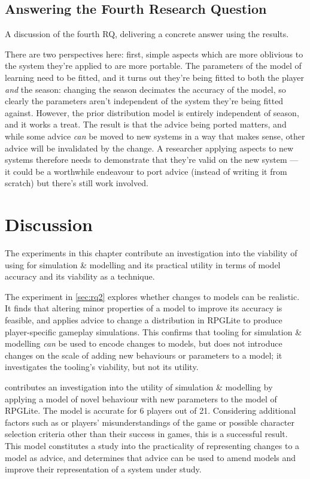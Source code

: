 \subsection{Answering the Fourth Research Question}

A discussion of the fourth RQ, delivering a concrete answer using the results.

There are two perspectives here: first, simple aspects which are more oblivious
to the system they're applied to are more portable. The parameters of the model
of learning need to be fitted, and it turns out they're being fitted to both the
player \emph{and} the season: changing the season decimates the accuracy of the
model, so clearly the parameters aren't independent of the system they're being
fitted against. However, the prior distribution model is entirely independent of
season, and it works a treat. The result is that the advice being ported
matters, and while some advice \emph{can} be moved to new systems in a way that
makes sense, other advice will be invalidated by the change. A researcher
applying aspects to new systems therefore needs to demonstrate that they're
valid on the new system --- it could be a worthwhile endeavour to port advice
(instead of writing it from scratch) but there's still work involved.





\section{Discussion}

The experiments in this chapter contribute an investigation into the
viability of using \aop for simulation \& modelling and its practical utility
in terms of model accuracy and its viability as a technique.

The experiment in \cref{sec:rq2} explores whether \aspectoriented{} changes to
models can be realistic. It finds that altering minor properties of a model to
improve its accuracy is feasible, and applies advice to change a distribution in
RPGLite to produce player-specific gameplay simulations. This confirms that
\aspectoriented{} tooling for simulation \& modelling \emph{can} be used to
encode changes to models, but does not introduce changes on the scale of adding
new behaviours or parameters to a model; it investigates the tooling's
viability, but not its utility.

 contributes an investigation into the utility of
\aspectoriented{} simulation \& modelling by applying a model of novel behaviour
with new parameters to the model of RPGLite. The model is accurate for 6 players
out of 21. Considering additional factors such as or players' misunderstandings
of the game or possible character selection criteria other than their success in
games, this is a successful result. This model constitutes a study into the
practicality of representing changes to a model as advice, and determines that
advice can be used to amend models and improve their representation of a system
under study.

